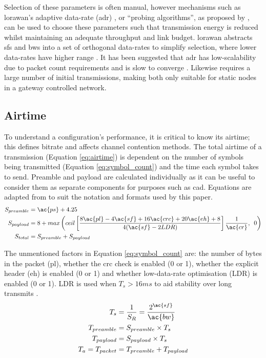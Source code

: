 Selection of these parameters is often manual, however mechanisms such as \ac{lorawan}'s adaptive data-rate (\ac{adr}) \cite{3YP:LORAWAN}, or ``probing algorithms'', as proposed by \cite{3YP:CHOOSING_LORA_PARAMETERS}, can be used to choose these parameters such that transmission energy is reduced whilst maintaining an adequate throughput and link budget. \ac{lorawan} abstracts \ac{sf}s and \ac{bw}s into a set of orthogonal data-rates to simplify selection, where lower data-rates have higher range \cite{3YP:LORAWAN_REGIONAL_PARAMS}. It has been suggested that \ac{adr} has low-scalability due to packet count requirements \cite{3YP:LORAWAN_ADR} and is slow to converge \cite{3YP:LORAWAN_ADR_AGILITY}. Likewise \cite{3YP:CHOOSING_LORA_PARAMETERS} requires a large number of initial transmissions, making both only suitable for static nodes in a gateway controlled network.

\subsection{Airtime}
To understand a configuration's performance, it is critical to know its airtime; this defines bitrate and affects channel contention methods. The total airtime of a transmission (Equation \ref{eq:airtime}) is dependent on the number of symbols being transmitted (Equation \ref{eq:symbol_count}) and the time each symbol takes to send. Preamble and payload are calculated individually as it can be useful to consider them as separate components for purposes such as \ac{cad}. Equations are adapted from \cite{3YP:LORA_SX12} to suit the notation and formats used by this paper.
\begin{subequations}
\label{eq:symbol_count}
\begin{align}
	S_{preamble} &= \ac{ps} + 4.25 \\
	S_{payload} &= 8 + max\left( ceil\left[ \frac{8\ac{pl}-4\ac{sf}+16\ac{crc}+20\ac{eh}+8}{4(\ac{sf}-2LDR)}\right] \frac{1}{\ac{cr}},\enskip 0\right) \\
	S_{total} &= S_{preamble} + S_{payload} 
\end{align}
\end{subequations}

The unmentioned factors in Equation \ref{eq:symbol_count} are: the number of bytes in the packet (\ac{pl}), whether the \ac{crc} check is enabled (0 or 1), whether the explicit header (\ac{eh}) is enabled (0 or 1) and whether low-data-rate optimisation (LDR) is enabled (0 or 1). LDR is used when $T_s > 16ms$ to aid stability over long transmits \cite{3YP:LORA_SX12}.
\begin{subequations}
\label{eq:airtime}
\begin{align}
	T_{s} &= \frac{1}{S_R} = \frac{2^{\ac{sf}}}{\ac{bw}}\\
	T_{preamble} &=  S_{preamble}\times T_{s}\\
	T_{payload} &= S_{payload}\times T_{s} \\
	T_{a} = T_{packet} &= T_{preamble} + T_{payload}
\end{align}
\end{subequations}

